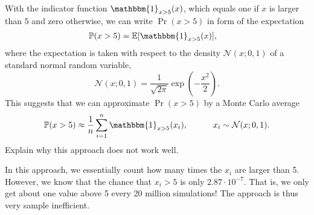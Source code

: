 \begin{exenumerate}
\item With the indicator function $\mathbbm{1}_{x>5}(x)$, which
  equals one if $x$ is larger than $5$ and zero otherwise, we can
  write $\Pr(x>5)$ in form of the expectation
  \begin{align}
    \Pr(x>5) &= \E[ \mathbbm{1}_{x>5}(x) ],
  \end{align}
  where the expectation is taken with respect to the density
  $\mathcal{N}(x; 0, 1)$ of a standard normal random variable,
  \begin{equation}
    \mathcal{N}(x; 0, 1) = \frac{1}{\sqrt{2\pi}} \exp\left(-\frac{x^2}{2}\right).
  \end{equation}
  This suggests that we can approximate $\Pr(x>5)$ by a Monte Carlo average
  \begin{equation}
    \Pr(x>5) \approx \frac{1}{n} \sum_{i=1}^n \mathbbm{1}_{x>5}(x_i), \quad \quad \quad x_i \sim  \mathcal{N}(x; 0, 1).
  \end{equation}
  Explain why this approach does not work well.

  \begin{solution}
    In this  approach, we essentially  count how many times  the $x_i$
    are larger than  5. However, we know that the  chance that $x_i>5$
    is only  $2.87 \cdot 10^{-7}$. That  is, we only  get about one value above 5
    every 20 million simulations! The approach is thus very sample inefficient.


\end{solution}
\end{exenumerate}
